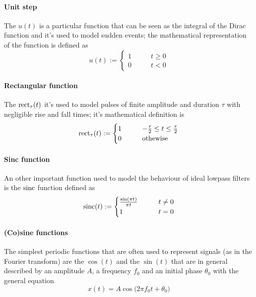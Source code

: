 	\paragraph{Unit step} The  $u(t)$ is a particular function that can be seen as the integral of the Dirac function and it's used to model sudden events; the mathematical representation of the function is defined as
	\begin{equation}
		u(t) := \begin{cases}
			1 \qquad & t \geq 0 \\
			0 \qquad & t < 0
		\end{cases}
	\end{equation}

	\paragraph{Rectangular function} The  $\textrm{rect}_\tau(t)$ it's used to model pulses of finite amplitude and duration $\tau$ with negligible rise and fall times; it's mathematical definition is
	\begin{equation} \label{eq:intro:rect}
		\textrm{rect}_\tau (t) := \begin{cases}
			1 \qquad & -\frac \tau2 \leq t \leq \frac \tau 2 \\
			0 & \textrm{othewise}
		\end{cases}
	\end{equation}

	\paragraph{Sinc function} An other important function used to model the behaviour of ideal lowpass filters is the  $\textrm{sinc}$ function defined as
	\begin{equation}
		\textrm{sinc}(t) := \begin{cases}
			\frac{\sin(\pi t)}{\pi t} \qquad & t \neq 0 \\
			1 & t = 0
		\end{cases}
	\end{equation}

	\paragraph{(Co)sine functions} The simplest periodic functions that are often used to represent signals (as in the Fourier transform) are the  $\cos(t)$ and the  $\sin(t)$ that are in general described by an amplitude $A$, a frequency $f_0$ and an initial phase $\theta_0$ with the general equation
	\begin{equation}
		x(t) = A \cos \big( 2\pi f_0 t + \theta_0 \big)
	\end{equation}

